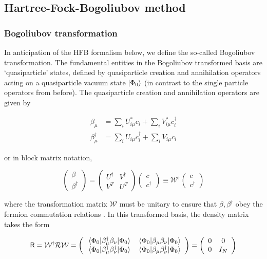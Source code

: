 \subsection{Hartree-Fock-Bogoliubov method}
\subsubsection{Bogoliubov transformation}

In anticipation of the HFB formalism below, we define the so-called Bogoliubov transformation. The fundamental entities in the Bogoliubov transformed basis are `quasiparticle' states, defined by quasiparticle creation and annihilation operators acting on a quasiparticle vacuum state $\ket{\Phi_0}$ (in contrast to the single particle operators from before). The quasiparticle creation and annihilation operators are given by

\begin{align}
\beta_\mu &= \sum_i U^*_{i\mu}c_i + \sum_i V^*_{i\mu}c_i^\dagger \\
\beta_\mu^\dagger &= \sum_i U_{i\mu}c_i^\dagger + \sum_i V_{i\mu}c_i
\end{align}

\noindent or in block matrix notation,

\begin{equation}
\left(\begin{array}{c} \beta \\ \beta^\dagger\end{array}\right) = 
\left(\begin{array}{cc} U^\dagger & V^\dagger \\ V^T & U^T \end{array}\right)
\left(\begin{array}{c} c \\ c^\dagger\end{array}\right)
\equiv \mathcal{W}^\dagger \left(\begin{array}{c} c \\ c^\dagger\end{array}\right)
\end{equation}

\noindent where the transformation matrix $\mathcal{W}$ must be unitary to ensure that $\beta, \beta^\dagger$ obey the fermion commutation relations \cite{Ring1980}. In this transformed basis, the density matrix takes the form 

\begin{equation}
\mathsf{R} = \mathcal{W}^\dagger\mathcal{R}\mathcal{W} = 
\left(\begin{array}{cc}
\expval{\beta_\mu^\dagger \beta_\nu}{\Phi_0} & \expval{\beta_\mu \beta_\nu}{\Phi_0} \\
\expval{\beta_\mu^\dagger \beta_\nu^\dagger}{\Phi_0} & \expval{\beta_\mu \beta_\nu^\dagger}{\Phi_0}
\end{array}\right) = 
\left(\begin{array}{cc}
0 & 0 \\
0 & I_N
\end{array}\right)
\end{equation}


